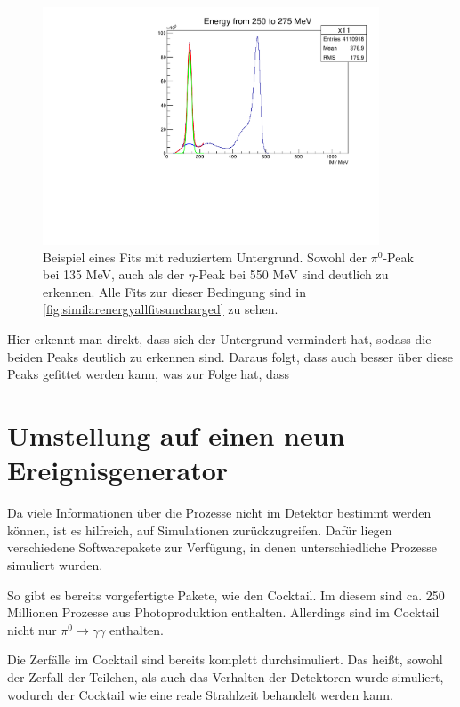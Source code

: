 \documentclass[a4paper,11pt,oneside,final,german,openbib,pdftex]{scrbook}
\begin{document}
{\begin{figure}[h!]
	\begin{center}
		\includegraphics[width=100mm]{NewCalib/Strahlzeit2014/20171904RealUnchargedFitExample}
	\end{center}
\caption[Strahlzeit: Beispiel eines Fits mit reduziertem Untergrund]{Beispiel eines Fits mit reduziertem Untergrund. Sowohl der $\pi^0$-Peak bei 135 MeV, auch als der $\eta$-Peak bei 550 MeV sind deutlich zu erkennen. Alle Fits zur dieser Bedingung sind in \ref{fig:similarenergyallfitsuncharged} zu sehen.}
\label{fig:Reduzierter-Untergrund-Fit}
\end{figure}
 Hier erkennt man direkt, dass sich der Untergrund vermindert hat, sodass die beiden Peaks deutlich zu erkennen sind. Daraus folgt, dass auch besser \"uber diese Peaks gefittet werden kann, was zur Folge hat, dass 


\section{Umstellung auf einen neun Ereignisgenerator}
\label{sec:Vorbereitung-der-Simulation}

Da viele Informationen \"uber die Prozesse nicht im Detektor bestimmt werden k\"onnen, ist es hilfreich, auf Simulationen zur\"uckzugreifen. Daf\"ur liegen verschiedene Softwarepakete zur Verf\"ugung, in denen unterschiedliche Prozesse simuliert wurden.

So gibt es bereits vorgefertigte Pakete, wie den Cocktail.
Im diesem sind ca. 250 Millionen Prozesse aus Photoproduktion enthalten. Allerdings sind im Cocktail nicht nur $\pi^0 \rightarrow \gamma \gamma$ enthalten.

Die Zerf\"alle im Cocktail sind bereits komplett durchsimuliert. Das hei{\ss}t, sowohl der Zerfall der Teilchen, als auch das Verhalten der Detektoren wurde simuliert, wodurch der Cocktail wie eine reale Strahlzeit behandelt werden kann.

}
\end{document}
